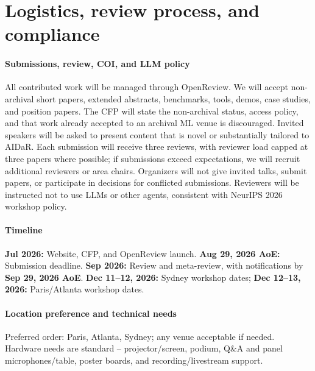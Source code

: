 \documentclass[10pt]{article}
\begin{document}
\section{Logistics, review process, and compliance}

\paragraph{Submissions, review, COI, and LLM policy}

All contributed work will be managed through OpenReview. We will accept non-archival short papers, extended abstracts, benchmarks, tools, demos, case studies, and position papers. The CFP will state the non-archival status, access policy, and that work already accepted to an archival ML venue is discouraged. Invited speakers will be asked to present content that is novel or substantially tailored to AIDaR. Each submission will receive three reviews, with reviewer load capped at three papers where possible; if submissions exceed expectations, we will recruit additional reviewers or area chairs. Organizers will not give invited talks, submit papers, or participate in decisions for conflicted submissions. Reviewers will be instructed not to use LLMs or other agents, consistent with NeurIPS 2026 workshop policy.



\vspace{-1mm}

\paragraph{Timeline}
\label{sec:timeline}

\textbf{Jul 2026:} Website, CFP, and OpenReview launch. 
\textbf{Aug 29, 2026 AoE:} Submission deadline. 
\textbf{Sep 2026:} Review and meta-review, with notifications by \textbf{Sep 29, 2026 AoE}. 
\textbf{Dec 11--12, 2026:} Sydney workshop dates; \textbf{Dec 12--13, 2026:} Paris/Atlanta workshop dates.

\vspace{-1mm}

\paragraph{Location preference and technical needs} Preferred order: {Paris, Atlanta, Sydney}; any venue acceptable if needed. Hardware needs are standard -- projector/screen, podium, Q\&A and panel microphones/table, poster boards, and  recording/livestream support. 
\end{document}
